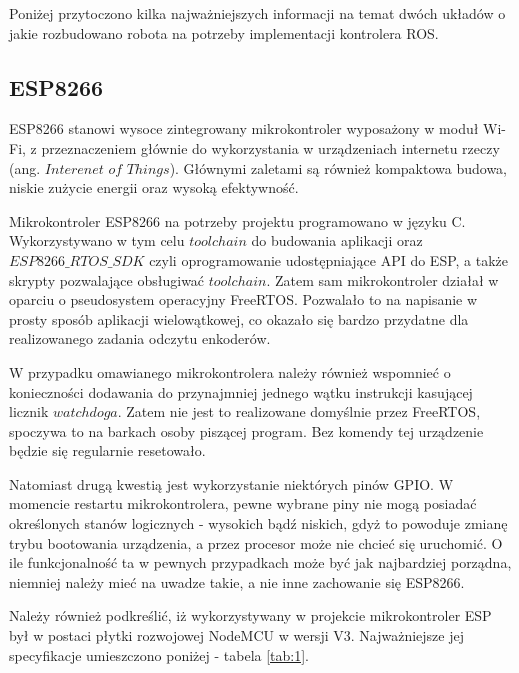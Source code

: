 Poniżej przytoczono kilka najważniejszych informacji na temat dwóch układów o jakie rozbudowano robota na potrzeby implementacji kontrolera ROS. \cite{MiM_wyk} 

\subsection{ESP8266}

ESP8266 stanowi wysoce zintegrowany mikrokontroler wyposażony w moduł Wi-Fi, z przeznaczeniem głównie do wykorzystania w urządzeniach internetu rzeczy (ang. $Interenet$ $of$ $Things$). Głównymi zaletami są również kompaktowa budowa, niskie zużycie energii oraz wysoką efektywność.\cite{ESP_doc}


Mikrokontroler ESP8266 na potrzeby projektu programowano w języku C. Wykorzystywano w tym celu $toolchain$ do budowania aplikacji oraz $ESP8266\_RTOS\_SDK$ czyli oprogramowanie udostępniające API do ESP, a także skrypty pozwalające obsługiwać $toolchain$. Zatem sam mikrokontroler działał w oparciu o pseudosystem operacyjny FreeRTOS. Pozwalało to na napisanie w prosty sposób aplikacji wielowątkowej, co okazało się bardzo przydatne dla realizowanego zadania odczytu enkoderów. \cite{ESP_prog}



W przypadku omawianego mikrokontrolera należy również wspomnieć o konieczności dodawania do przynajmniej jednego wątku instrukcji kasującej licznik $watchdoga$. Zatem nie jest to realizowane domyślnie przez FreeRTOS, spoczywa to na barkach osoby piszącej program. Bez komendy tej urządzenie będzie się regularnie resetowało. 

Natomiast drugą kwestią jest wykorzystanie niektórych pinów GPIO. W momencie restartu mikrokontrolera, pewne wybrane piny nie mogą posiadać określonych stanów logicznych - wysokich bądź niskich, gdyż to powoduje zmianę trybu bootowania urządzenia, a przez procesor może nie chcieć się uruchomić. O ile funkcjonalność ta w pewnych przypadkach może być jak najbardziej porządna, niemniej należy mieć na uwadze takie, a nie inne zachowanie się ESP8266.

Należy również podkreślić, iż wykorzystywany w projekcie mikrokontroler ESP był w postaci płytki rozwojowej NodeMCU w wersji V3. Najważniejsze jej specyfikacje umieszczono poniżej - tabela \ref{tab:1}.

